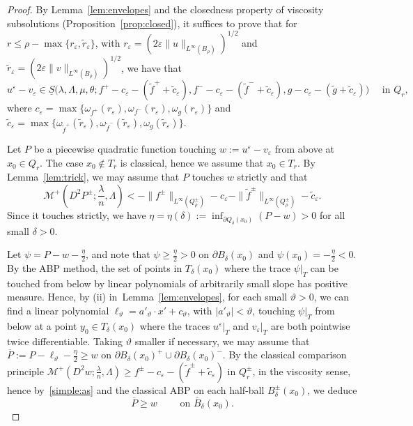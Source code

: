 \documentclass[letter,11pt]{amsart}
\newcommand{\vep}{\varepsilon}
\newcommand{\mcal}{\mathcal{M}}
\theoremstyle{definition}
\numberwithin{equation}{section}
\begin{document}
\begin{proof}
By Lemma~\ref{lem:envelopes} and the closedness property of viscosity subsolutions (Proposition~\ref{prop:closed}), it suffices to prove that for $r \leq \rho - \max\{r_{\vep}, \widetilde{r}_{\vep}\}$, with $r_{\vep} = (2 \vep \|u\|_{L^{\infty}(B_{\rho})})^{1/2}$ and $\widetilde{r}_{\vep} = (2 \vep \|v\|_{L^{\infty}(B_{\rho})})^{1/2}$, we have that
\[
u^{\vep} - v_{\vep} \in 
\underline{S}(
\lambda, \Lambda, \mu, \theta;
f^{+} - c_{\vep} - (\widetilde{f}^{+} + \widetilde{c}_{\vep}),
f^{-} - c_{\vep} - (\widetilde{f}^{-} + \widetilde{c}_{\vep}),
g- c_{\vep} - (\widetilde{g} + \widetilde{c}_{\vep})
\big) 
\quad \text{ in } Q_{r},
\]
where $c_{\vep}= \max\{\omega_{f^{+}}(r_{\vep}), \omega_{f^{-}}(r_{\vep}), \omega_{g}(r_{\vep})\}$ and $\widetilde{c}_{\vep}= \max\{\omega_{\widetilde{f}^{+}}(\widetilde{r}_{\vep}), \omega_{\widetilde{f}^{-}}(\widetilde{r}_{\vep}), \omega_{g}(\widetilde{r}_{\vep})\}$.

\medskip

Let $P$ be a piecewise quadratic function touching $w := u^{\vep} - v_{\vep}$ from above at $x_0 \in Q_r$.
The case $x_0 \notin T_r$ is classical, hence we assume that $x_0 \in T_r$.
By Lemma~\ref{lem:trick}, we may assume that $P$ touches $w$ strictly and that
\begin{equation}
\label{simple:as}
\textstyle
\mcal^{+}(D^2 P^{\pm}; \frac{\lambda}{n}, \Lambda) < 
- \|f^{\pm}\|_{L^{\infty}(Q_{\rho}^{\pm})}
- c_{\vep}
- \|\widetilde{f}^{\pm}\|_{L^{\infty}(Q_{\rho}^{\pm})}
- \widetilde{c}_{\vep}.
\end{equation}
Since it touches strictly, we have $\eta = \eta(\delta) := \inf_{\partial Q_{\delta}(x_0)} (P - w) > 0$ for all small $\delta >0$.

\medskip

Let $\psi = P - w- \frac{\eta}{2}$, and note that $\psi \geq \frac{\eta}{2} >0$ on $\partial B_{\delta}(x_0)$ and $\psi(x_0) = - \frac{\eta}{2} <0$.
By the ABP method, the set of points in $T_{\delta}(x_0)$ where the trace $\psi|_{T}$ can be touched from below by linear polynomials of arbitrarily small slope has positive measure.
Hence, by (ii) in~Lemma~\ref{lem:envelopes}, for each small $\vartheta > 0$, we can find a linear polynomial $\ell_{\vartheta} = a'_{\vartheta} \cdot x' + c_{\vartheta}$, with $|a'_{\vartheta}| < \vartheta$, touching $\psi|_{T}$ from below at a point $y_{0} \in T_{\delta}(x_0)$ where the traces $u^{\vep}|_{T}$ and $v_{\vep}|_{T}$ are both pointwise twice differentiable.
Taking $\vartheta$ smaller if necessary, we may assume that $\overline{P} := P - \ell_{\vartheta} - \frac{\eta}{2} \geq w$ on $\partial B_{\delta}(x_{0})^{+} \cup \partial B_{\delta}(x_0)^{-}$.
By the classical comparison principle $\mcal^{+}(D^2 w; \frac{\lambda}{n}, \Lambda)\geq  f^{\pm} - c_{\vep} - (\widetilde{f}^{\pm}+\widetilde{c}_{\vep})$ in $Q_{r}^{\pm}$, in the viscosity sense, hence by~\eqref{simple:as} and the classical ABP on each half-ball $B^{\pm}_{\delta}(x_0)$, we deduce
\begin{equation}
\label{imp:step}
\overline{P} \geq w \qquad \text{ on } 
\overline{B}_{\delta}(x_0).
\end{equation}


\end{proof}
\end{document}
